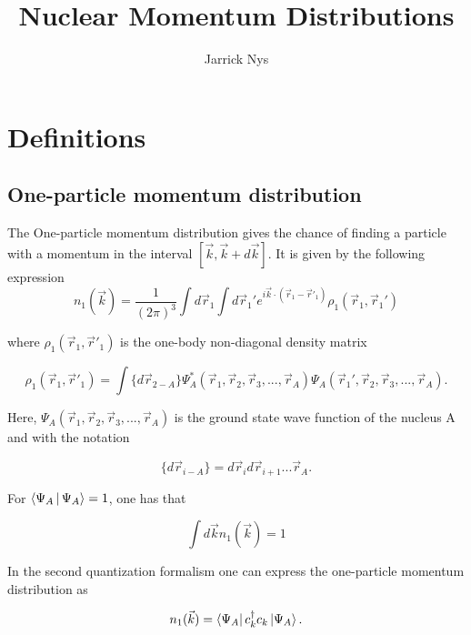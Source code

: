 \documentclass[12pt]{article}
\title{Nuclear Momentum Distributions}
\author{Jarrick Nys}
\begin{document}
\maketitle
\section{Definitions}

\subsection{One-particle momentum distribution}

The One-particle momentum distribution gives the chance of finding a particle with a momentum in the interval $[\vec{k},\vec{k}+d\vec{k}]$. It is given by the following expression
\begin{equation} \label{eq:one_patricle_distr}
	n_1(\vec{k})=\frac{1}{(2\pi)^3}\int d\vec{r}_1 \int d\vec{r}_1' e^{i\vec{k}\cdot (\vec{r}_1-\vec{r}'_1)}\rho_1(\vec{r}_1,\vec{r}_1')
\end{equation}

where $\rho_1(\vec{r}_1,\vec{r}'_1)$ is the one-body non-diagonal density matrix


\begin{equation}
\rho_1(\vec{r}_1,\vec{r}'_1) = \int \{d\vec{r}_{2-A}\} \Psi^*_A(\vec{r}_1,\vec{r}_2,\vec{r}_3, ... ,\vec{r}_A)\Psi_A(\vec{r}_1',\vec{r}_2,\vec{r}_3, ... ,\vec{r}_A).
\end{equation}



Here, $\Psi_A(\vec{r}_1,\vec{r}_2,\vec{r}_3, ... ,\vec{r}_A)$ is the ground state wave function of the nucleus A and with the notation 

\begin{equation}
\{d\vec{r}_{i-A}\}  = d\vec{r}_i d\vec{r}_{i+1}...\vec{r}_A.
\end{equation}
 


For $\Braket{\Psi_A|\Psi_A}=1$, one has that


\begin{equation}
\int d\vec{k}n_1(\vec{k})=1
\end{equation}

In the second quantization formalism one can express the one-particle momentum distribution as

\begin{equation}
n_1(\vec{k})= \bra{\Psi_A} c^\dagger_k c_k \ket{\Psi_A}.
\end{equation}
\end{document}
